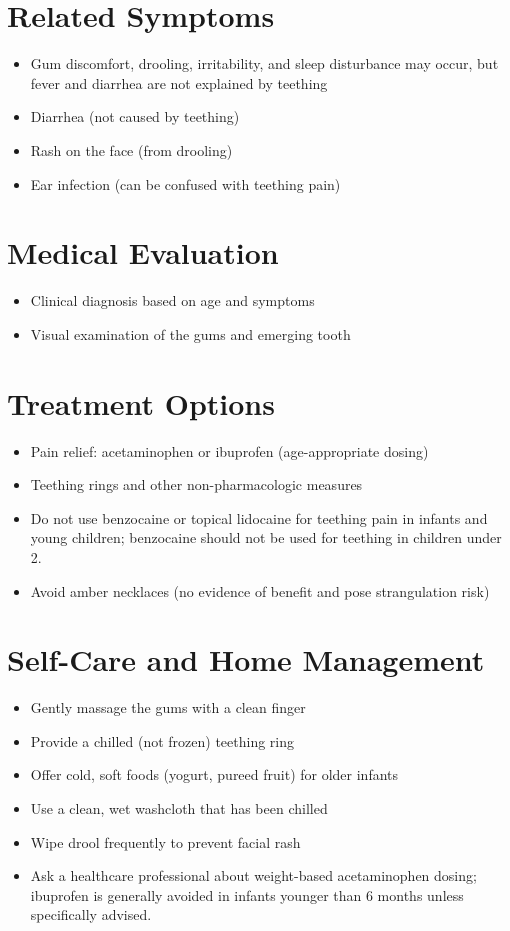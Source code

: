 \section*{Related Symptoms}
\begin{itemize}
\item Gum discomfort, drooling, irritability, and sleep disturbance may occur, but fever and diarrhea are not explained by teething
\item Diarrhea (not caused by teething)
\item Rash on the face (from drooling)
\item Ear infection (can be confused with teething pain)
\end{itemize}

\section*{Medical Evaluation}
\begin{itemize}
\item Clinical diagnosis based on age and symptoms
\item Visual examination of the gums and emerging tooth
\end{itemize}

\section*{Treatment Options}
\begin{itemize}
\item Pain relief: acetaminophen or ibuprofen (age-appropriate dosing)
\item Teething rings and other non-pharmacologic measures
\item Do not use benzocaine or topical lidocaine for teething pain in infants and young children; benzocaine should not be used for teething in children under 2.
\item Avoid amber necklaces (no evidence of benefit and pose strangulation risk)
\end{itemize}

\section*{Self-Care and Home Management}
\begin{itemize}
\item Gently massage the gums with a clean finger
\item Provide a chilled (not frozen) teething ring
\item Offer cold, soft foods (yogurt, pureed fruit) for older infants
\item Use a clean, wet washcloth that has been chilled
\item Wipe drool frequently to prevent facial rash
\item Ask a healthcare professional about weight-based acetaminophen dosing; ibuprofen is generally avoided in infants younger than 6 months unless specifically advised.
\end{itemize}

